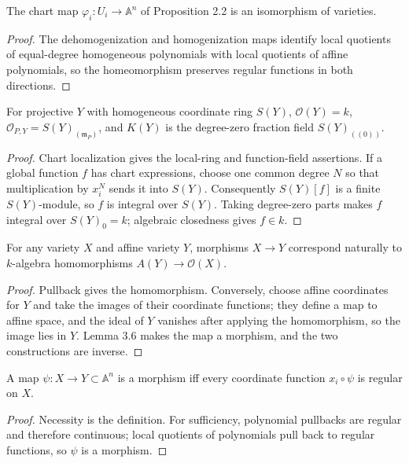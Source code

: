 \begin{proposition}
\label{prop:ha-ch1-3-3}
The chart map $\varphi_i:U_i\to\mathbb A^n$ of Proposition 2.2 is an isomorphism of varieties.
\end{proposition}
\begin{proof}
The dehomogenization and homogenization maps identify local quotients of equal-degree homogeneous
polynomials with local quotients of affine polynomials, so the homeomorphism preserves regular
functions in both directions.
\end{proof}

\begin{theorem}
\label{thm:ha-ch1-3-4}
For projective $Y$ with homogeneous coordinate ring $S(Y)$, $\mathcal O(Y)=k$,
$\mathcal O_{P,Y}=S(Y)_{(\mathfrak m_P)}$, and $K(Y)$ is the degree-zero fraction field
$S(Y)_{((0))}$.
\end{theorem}
\begin{proof}
Chart localization gives the local-ring and function-field assertions.  If a global function $f$
has chart expressions, choose one common degree $N$ so that multiplication by $x_i^N$ sends it
into $S(Y)$.  Consequently $S(Y)[f]$ is a finite $S(Y)$-module, so $f$ is integral over $S(Y)$.
Taking degree-zero parts makes $f$ integral over $S(Y)_0=k$; algebraic closedness gives $f\in k$.
\end{proof}

\begin{proposition}
\label{prop:ha-ch1-3-5}
For any variety $X$ and affine variety $Y$, morphisms $X\to Y$ correspond naturally to
$k$-algebra homomorphisms $A(Y)\to\mathcal O(X)$.
\end{proposition}
\begin{proof}
Pullback gives the homomorphism.  Conversely, choose affine coordinates for $Y$ and take the
images of their coordinate functions; they define a map to affine space, and the ideal of $Y$
vanishes after applying the homomorphism, so the image lies in $Y$.  Lemma 3.6 makes the map a
morphism, and the two constructions are inverse.
\end{proof}

\begin{lemma}
\label{lem:ha-ch1-3-6}
A map $\psi:X\to Y\subset\mathbb A^n$ is a morphism iff every coordinate function $x_i\circ\psi$
is regular on $X$.
\end{lemma}
\begin{proof}
Necessity is the definition.  For sufficiency, polynomial pullbacks are regular and therefore
continuous; local quotients of polynomials pull back to regular functions, so $\psi$ is a morphism.
\end{proof}

